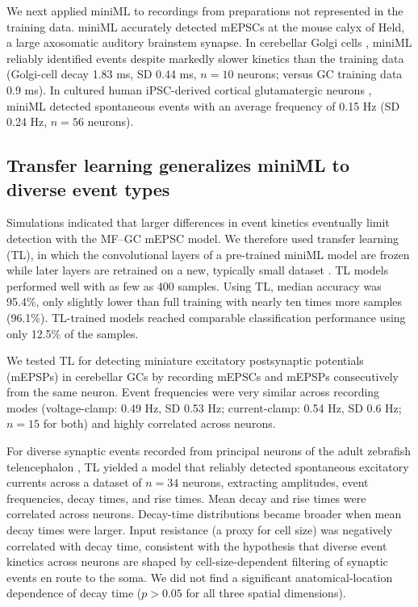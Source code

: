 \documentclass[9pt,lineno]{article}
\begin{document}
We next applied miniML to recordings from preparations not represented in the training data. miniML accurately detected mEPSCs at the mouse calyx of Held, a large axosomatic auditory brainstem synapse. In cerebellar Golgi cells \citep{Kita2021}, miniML reliably identified events despite markedly slower kinetics than the training data (Golgi-cell decay 1.83 ms, SD 0.44 ms, $n = 10$ neurons; versus GC training data 0.9 ms). In cultured human iPSC-derived cortical glutamatergic neurons \citep{Asadollahi2023}, miniML detected spontaneous events with an average frequency of 0.15 Hz (SD 0.24 Hz, $n = 56$ neurons).

\subsection{Transfer learning generalizes miniML to diverse event types}

Simulations indicated that larger differences in event kinetics eventually limit detection with the MF--GC mEPSC model. We therefore used transfer learning (TL), in which the convolutional layers of a pre-trained miniML model are frozen while later layers are retrained on a new, typically small dataset \citep{Caruana1994,Theodoris2023,Yosinski2014}. TL models performed well with as few as 400 samples. Using TL, median accuracy was 95.4\%, only slightly lower than full training with nearly ten times more samples (96.1\%). TL-trained models reached comparable classification performance using only 12.5\% of the samples.

We tested TL for detecting miniature excitatory postsynaptic potentials (mEPSPs) in cerebellar GCs by recording mEPSCs and mEPSPs consecutively from the same neuron. Event frequencies were very similar across recording modes (voltage-clamp: 0.49 Hz, SD 0.53 Hz; current-clamp: 0.54 Hz, SD 0.6 Hz; $n = 15$ for both) and highly correlated across neurons.

For diverse synaptic events recorded from principal neurons of the adult zebrafish telencephalon \citep{RupprechtFriedrich2018}, TL yielded a model that reliably detected spontaneous excitatory currents across a dataset of $n = 34$ neurons, extracting amplitudes, event frequencies, decay times, and rise times. Mean decay and rise times were correlated across neurons. Decay-time distributions became broader when mean decay times were larger. Input resistance (a proxy for cell size) was negatively correlated with decay time, consistent with the hypothesis that diverse event kinetics across neurons are shaped by cell-size-dependent filtering of synaptic events en route to the soma. We did not find a significant anatomical-location dependence of decay time ($p > 0.05$ for all three spatial dimensions).
\end{document}
